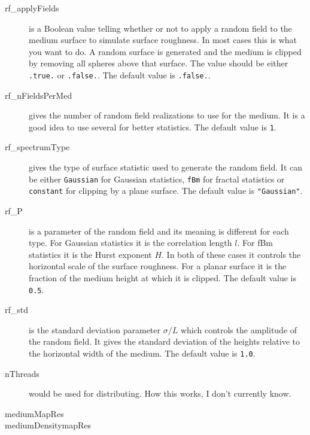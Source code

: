 \documentclass[a4paper]{article}
\newcommand{\code}[1]{\lstinline{#1}}
\begin{document}
\begin{description}
	\item[rf\_applyFields] is a Boolean value telling whether or not to apply a random field to the medium surface to simulate surface roughness. In most cases this is what you want to do. A random surface is generated and the medium is clipped by removing all spheres above that surface. The value should be either \code{.true.} or \code{.false.}. The default value is \code{.false.}.
	\item[rf\_nFieldsPerMed] gives the number of random field realizations to use for the medium. It is a good idea to use several for better statistics. The default value is \code{1}.
	\item[rf\_spectrumType] gives the type of surface statistic used to generate the random field. It can be either \code{Gaussian} for Gaussian statistics, \code{fBm} for fractal statistics or \code{constant} for clipping by a plane surface. The default value is \code{"Gaussian"}.
	\item[rf\_P] is a parameter of the random field and its meaning is different for each type. For Gaussian statistics it is the correlation length $l$. For fBm statistics it is the Hurst exponent $H$. In both of these cases it controls the horizontal scale of the surface roughness. For a planar surface it is the fraction of the medium height at which it is clipped. The default value is \code{0.5}. %
	\item[rf\_std] is the standard deviation parameter $\sigma/L$ which controls the amplitude of the random field. It gives the standard deviation of the heights relative to the horizontal width of the medium. The default value is \code{1.0}.
	\item[nThreads] would be used for distributing. How this works, I don't currently know. %
	\item[mediumMapRes]
	\item[mediumDensitymapRes]
\end{description}
\end{document}
